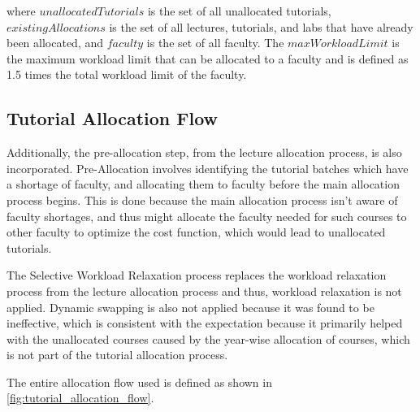 where $unallocatedTutorials$ is the set of all unallocated tutorials, $existingAllocations$ is the set of all lectures, tutorials, and labs that have already been allocated, and $faculty$ is the set of all faculty. The $maxWorkloadLimit$ is the maximum workload limit that can be allocated to a faculty and is defined as 1.5 times the total workload limit of the faculty.

\subsection{Tutorial Allocation Flow}

Additionally, the pre-allocation step, from the lecture allocation process, is also incorporated. Pre-Allocation involves identifying the tutorial batches which have a shortage of faculty, and allocating them to faculty before the main allocation process begins. This is done because the main allocation process isn't aware of faculty shortages, and thus might allocate the faculty needed for such courses to other faculty to optimize the cost function, which would lead to unallocated tutorials.

The Selective Workload Relaxation process replaces the workload relaxation process from the lecture allocation process and thus, workload relaxation is not applied. Dynamic swapping is also not applied because it was found to be ineffective, which is consistent with the expectation because it primarily helped with the unallocated courses caused by the year-wise allocation of courses, which is not part of the tutorial allocation process.

The entire allocation flow used is defined as shown in \autoref{fig:tutorial_allocation_flow}.

